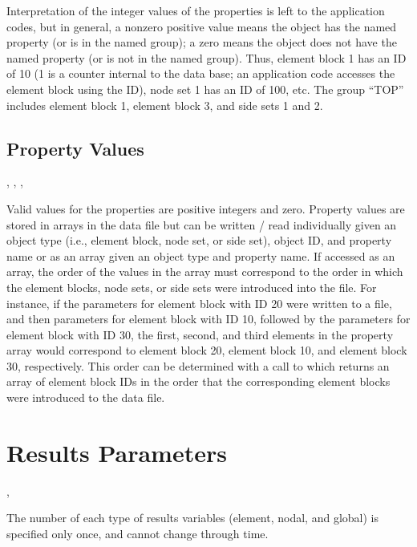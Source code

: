 {Interpretation of the integer values of the properties is left to the
application codes, but in general, a nonzero positive value means the
object has the named property (or is in the named group); a zero means
the object does not have the named property (or is not in the named
group). Thus, element block 1 has an ID of 10 (1 is a counter internal
to the data base; an application code accesses the element block using
the ID), node set 1 has an ID of 100, etc. The group ``TOP'' includes
element block 1, element block 3, and side sets 1 and 2.}



\subsection{Property Values}



\begin{spacing}{1.5}
\api {}, , , 
\end{spacing}

Valid values for the properties are positive integers and
zero. Property values are stored in arrays in the data file but can be
written / read individually given an object type (i.e., element block,
node set, or side set), object ID, and property name or as an array
given an object type and property name. If accessed as an array, the
order of the values in the array must correspond to the order in which
the element blocks, node sets, or side sets were introduced into the
file. For instance, if the parameters for element block with ID 20
were written to a file, and then parameters for element block with ID
10, followed by the parameters for element block with ID 30, the
first, second, and third elements in the property array would
correspond to element block 20, element block 10, and element block
30, respectively. This order can be determined with a call to
 which returns an array of element
block IDs in the order that the corresponding element blocks were
introduced to the data file.

\section{Results Parameters}

\api{}, 


The number of each type of results variables (element, nodal, 
and global) is specified only once, and cannot change through 
time.

